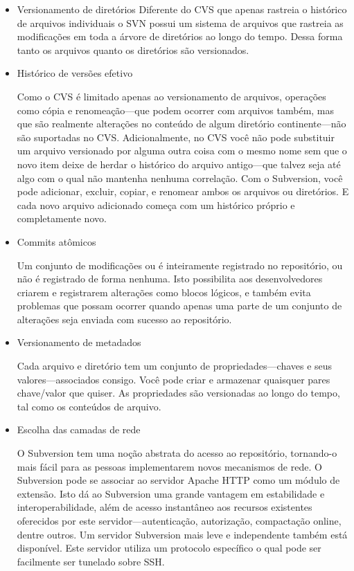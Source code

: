   \begin{itemize}
  \item Versionamento de diretórios
  Diferente do CVS que apenas rastreia o histórico de arquivos individuais o SVN possui um sistema de arquivos que rastreia as modificações em toda a árvore de diretórios ao longo do tempo. Dessa forma tanto os arquivos quanto os diretórios são versionados.

  \item Histórico de versões efetivo

  Como o CVS é limitado apenas ao versionamento de arquivos, operações como cópia e renomeação—que podem ocorrer com arquivos também, mas que são realmente alterações no conteúdo de algum diretório continente—não são suportadas no CVS. Adicionalmente, no CVS você não pode substituir um arquivo versionado por alguma outra coisa com o mesmo nome sem que o novo item deixe de herdar o histórico do arquivo antigo—que talvez seja até algo com o qual não mantenha nenhuma correlação. Com o Subversion, você pode adicionar, excluir, copiar, e renomear ambos os arquivos ou diretórios. E cada novo arquivo adicionado começa com um histórico próprio e completamente novo.

  \item Commits atômicos

  Um conjunto de modificações ou é inteiramente registrado no repositório, ou não é registrado de forma nenhuma. Isto possibilita aos desenvolvedores criarem e registrarem alterações como blocos lógicos, e também evita problemas que possam ocorrer quando apenas uma parte de um conjunto de alterações seja enviada com sucesso ao repositório.

  \item Versionamento de metadados

  Cada arquivo e diretório tem um conjunto de propriedades—chaves e seus valores—associados consigo. Você pode criar e armazenar quaisquer pares chave/valor que quiser. As propriedades são versionadas ao longo do tempo, tal como os conteúdos de arquivo.

  \item Escolha das camadas de rede

  O Subversion tem uma noção abstrata do acesso ao repositório, tornando-o mais fácil para as pessoas implementarem novos mecanismos de rede. O Subversion pode se associar ao servidor Apache HTTP como um módulo de extensão. Isto dá ao Subversion uma grande vantagem em estabilidade e interoperabilidade, além de acesso instantâneo aos recursos existentes oferecidos por este servidor—autenticação, autorização, compactação online, dentre outros. Um servidor Subversion mais leve e independente também está disponível. Este servidor utiliza um protocolo específico o qual pode ser facilmente ser tunelado sobre SSH.


\end{itemize}
